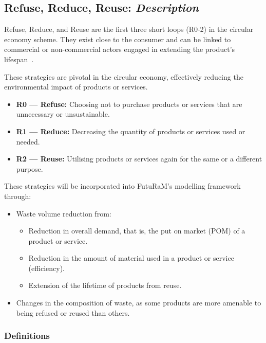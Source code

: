 \subsection{Refuse, Reduce, Reuse: \textit{Description}}

Refuse, Reduce, and Reuse are the first three short loops (R0-2) in the circular economy scheme. They exist close to the 
consumer and can be linked to commercial or non-commercial actors engaged in extending the product's lifespan~\cite{vermeulen2019rex}.



These strategies are pivotal in the circular economy, effectively reducing the environmental impact of products or services.

\begin{itemize}
    \item \textbf{R0 --- Refuse:} Choosing not to purchase products or services that are unnecessary or unsustainable. 
    \item \textbf{R1 --- Reduce:} Decreasing the quantity of products or services used or needed.
    \item \textbf{R2 --- Reuse:} Utilising products or services again for the same or a different purpose.
\end{itemize}

These strategies will be incorporated into FutuRaM's modelling framework through:

\begin{itemize}
    \item Waste volume reduction from:
    \begin{itemize}
        \item Reduction in overall demand, that is, the put on market (POM) of a product or service.
        \item Reduction in the amount of material used in a product or service (efficiency).
        \item Extension of the lifetime of products from reuse.
    \end{itemize}
    \item Changes in the composition of waste, as some products are more amenable to being refused or reused than others. 
\end{itemize}

\subsubsection{Definitions}


